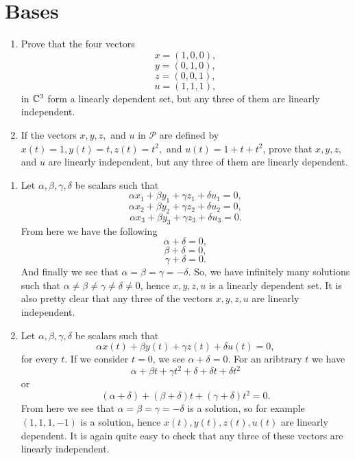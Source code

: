 \section{Bases}


\begin{problem}
  \begin{enumerate}[label=(\alph*)]
    \item Prove that the four vectors
      \[x = (1, 0, 0),\]
      \[y = (0, 1, 0),\]
      \[z = (0, 0, 1),\]
      \[u = (1, 1, 1),\]
      in $\mathbb{C}^3$ form a linearly dependent set, but any three of them are linearly independent.
    \item If the vectors $x, y, z,$ and $u$ in $\mathcal{P}$ are defined by $x(t) = 1, y(t) = t, z(t) = t^2,$ and $u(t) = 1 + t + t^2$, prove that $x, y, z,$ and $u$ are linearly independent, but any three of them are linearly dependent.
  \end{enumerate}
\end{problem}

\begin{solution}
  \begin{enumerate}[label=(\alph*)]
    \item Let $\alpha, \beta, \gamma, \delta$ be scalars such that
      \[\alpha x_1 + \beta y_1 + \gamma z_1 + \delta u_1 = 0,\]
      \[\alpha x_2 + \beta y_2 + \gamma z_2 + \delta u_2 = 0,\]
      \[\alpha x_3 + \beta y_3 + \gamma z_3 + \delta u_3 = 0.\]
      From here we have the following
      \[\alpha + \delta = 0,\]
      \[\beta + \delta = 0,\]
      \[\gamma + \delta = 0.\]
      And finally we see that $\alpha = \beta = \gamma = -\delta$.
      So, we have infinitely many solutions such that $\alpha \neq \beta \neq \gamma \neq \delta \neq 0$, hence $x, y, z, u$ is a linearly dependent set.
      It is also pretty clear that any three of the vectors $x, y, z, u$ are linearly independent.
    \item Let $\alpha, \beta, \gamma, \delta$ be scalars such that
      \[\alpha x(t) + \beta y(t) + \gamma z(t) + \delta u(t) = 0,\]
      for every $t$.
      If we consider $t = 0$, we see $\alpha + \delta = 0$.
      For an aribtrary $t$ we have
      \[\alpha + \beta t + \gamma t^2 + \delta + \delta t + \delta t^2\]
      or
      \[(\alpha + \delta) + (\beta + \delta)t + (\gamma + \delta)t^2 = 0.\]
      From here we see that $\alpha = \beta = \gamma = -\delta$ is a solution, so for example $(1, 1, 1, -1)$ is a solution, hence $x(t), y(t), z(t), u(t)$ are linearly dependent.
      It is again quite easy to check that any three of these vectors are linearly independent.
  \end{enumerate}
\end{solution}

